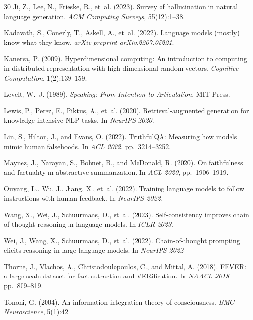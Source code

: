 \documentclass[12pt,a4paper]{article}
\begin{document}
\begin{thebibliography}{30}
Ji, Z., Lee, N., Frieske, R., et~al. (2023).
\newblock Survey of hallucination in natural language generation.
\newblock \emph{ACM Computing Surveys}, 55(12):1--38.

Kadavath, S., Conerly, T., Askell, A., et~al. (2022).
\newblock Language models (mostly) know what they know.
\newblock \emph{arXiv preprint arXiv:2207.05221}.

Kanerva, P. (2009).
\newblock Hyperdimensional computing: An introduction to computing in distributed representation with high-dimensional random vectors.
\newblock \emph{Cognitive Computation}, 1(2):139--159.

Levelt, W.~J. (1989).
\newblock \emph{Speaking: From Intention to Articulation}.
\newblock MIT Press.

Lewis, P., Perez, E., Piktus, A., et~al. (2020).
\newblock Retrieval-augmented generation for knowledge-intensive NLP tasks.
\newblock In \emph{NeurIPS 2020}.

Lin, S., Hilton, J., and Evans, O. (2022).
\newblock TruthfulQA: Measuring how models mimic human falsehoods.
\newblock In \emph{ACL 2022}, pp.\ 3214--3252.

Maynez, J., Narayan, S., Bohnet, B., and McDonald, R. (2020).
\newblock On faithfulness and factuality in abstractive summarization.
\newblock In \emph{ACL 2020}, pp.\ 1906--1919.

Ouyang, L., Wu, J., Jiang, X., et~al. (2022).
\newblock Training language models to follow instructions with human feedback.
\newblock In \emph{NeurIPS 2022}.

Wang, X., Wei, J., Schuurmans, D., et~al. (2023).
\newblock Self-consistency improves chain of thought reasoning in language models.
\newblock In \emph{ICLR 2023}.

Wei, J., Wang, X., Schuurmans, D., et~al. (2022).
\newblock Chain-of-thought prompting elicits reasoning in large language models.
\newblock In \emph{NeurIPS 2022}.

Thorne, J., Vlachos, A., Christodoulopoulos, C., and Mittal, A. (2018).
\newblock FEVER: a large-scale dataset for fact extraction and VERification.
\newblock In \emph{NAACL 2018}, pp.\ 809--819.

Tononi, G. (2004).
\newblock An information integration theory of consciousness.
\newblock \emph{BMC Neuroscience}, 5(1):42.

\end{thebibliography}
\end{document}
